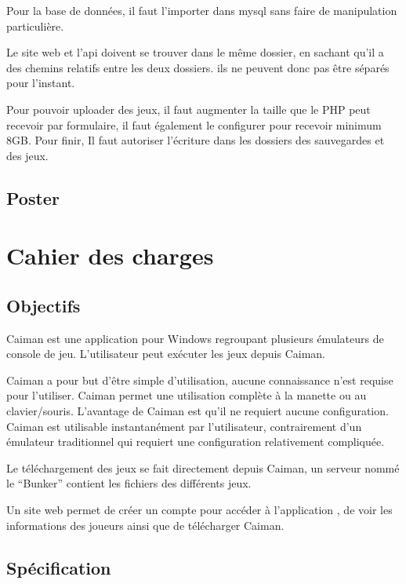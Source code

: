 \documentclass[a4paper,12pt,french]{sphinxmanual}
\begin{document}
\sphinxAtStartPar
Pour la base de données, il faut l’importer dans mysql sans faire de manipulation particulière.

\sphinxAtStartPar
Le site web et l’api doivent se trouver dans le même dossier, en sachant qu’il a des chemins relatifs entre les deux dossiers. ils ne peuvent donc pas être séparés pour l’instant.

\sphinxAtStartPar
Pour pouvoir uploader des jeux, il faut augmenter la taille que le PHP peut recevoir par formulaire, il faut également le configurer pour recevoir minimum 8GB. Pour finir, Il faut autoriser l’écriture dans les dossiers des sauvegardes et des jeux.


\section{Poster}
\label{\detokenize{introduction:poster}}
\sphinxAtStartPar
{}


\chapter{Cahier des charges}
\label{\detokenize{cdc:cahier-des-charges}}\label{\detokenize{cdc::doc}}

\section{Objectifs}
\label{\detokenize{cdc:objectifs}}
\sphinxAtStartPar
Caiman est une application pour Windows regroupant plusieurs émulateurs de console de jeu. L’utilisateur peut exécuter les jeux depuis Caiman.

\sphinxAtStartPar
Caiman a pour but d’être simple d’utilisation, aucune connaissance n’est requise pour l’utiliser. Caiman permet une utilisation complète à la manette ou au clavier/souris. L’avantage de Caiman est qu’il ne requiert aucune configuration. Caiman est utilisable instantanément par l’utilisateur, contrairement  d’un émulateur traditionnel qui requiert une configuration relativement compliquée.

\sphinxAtStartPar
Le téléchargement des jeux se fait directement depuis Caiman, un serveur nommé le “Bunker” contient les fichiers des différents jeux.

\sphinxAtStartPar
Un site web permet de créer un compte pour accéder à l’application , de voir les informations des joueurs ainsi que de télécharger Caiman.


\section{Spécification}
\label{\detokenize{cdc:specification}}
\end{document}
